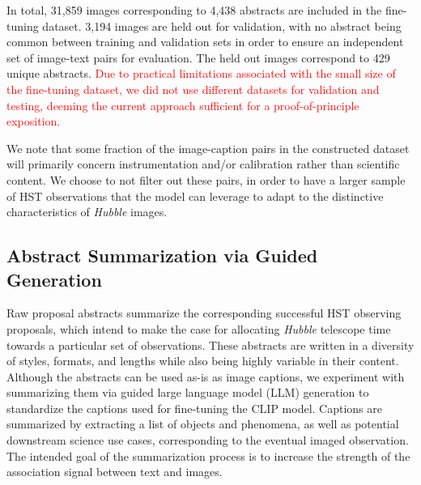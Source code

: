 \documentclass{article} %
\newcommand{\hubble}{\emph{Hubble}\xspace}
\newcommand{\changes}[1]{\textcolor{red}{#1}}
\begin{document}
   In total, 31,859 images corresponding to 4,438 abstracts are included in the fine-tuning dataset.
   3,194 images are held out for validation, with no abstract being common between training and validation sets in order to ensure an independent set of image-text pairs for evaluation. The held out images correspond to 429 unique abstracts.  %
   \changes{Due to practical limitations associated with the small size of the fine-tuning dataset, we did not use different datasets for validation and testing, deeming the current approach sufficient for a proof-of-principle exposition.}

   We note that some fraction of the image-caption pairs in the constructed dataset will primarily concern instrumentation and/or calibration rather than scientific content.
   We choose to not filter out these pairs, in order to have a larger sample of HST observations that the model can leverage to adapt to the distinctive characteristics of \hubble images.
   
   \subsection{Abstract Summarization via Guided Generation}
   \label{sec:summarization}
   
   Raw proposal abstracts summarize the corresponding successful HST observing proposals, which intend to make the case for allocating \hubble telescope time towards a particular set of observations.
   These abstracts are written in a diversity of styles, formats, and lengths while also being highly variable in their content.
   Although the abstracts can be used as-is as image captions, we experiment with summarizing them via guided large language model (LLM) generation to standardize the captions used for fine-tuning the CLIP model.
   Captions are summarized by extracting a list of objects and phenomena, as well as potential downstream science use cases, corresponding to the eventual imaged observation.
   The intended goal of the summarization process is to increase the strength of the association signal between text and images.
   
\end{document}
